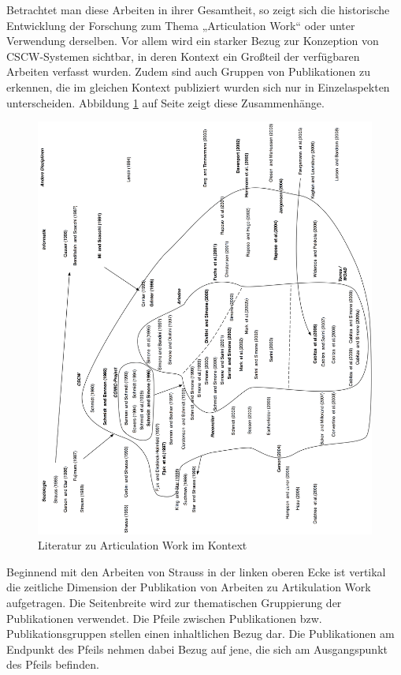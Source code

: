 Betrachtet man diese Arbeiten in ihrer Gesamtheit, so zeigt sich die historische Entwicklung der Forschung zum Thema „Articulation Work“ oder unter Verwendung derselben. Vor allem wird ein starker Bezug zur Konzeption von \gls{CSCW}-Systemen sichtbar, in deren Kontext ein Großteil der verfügbaren Arbeiten verfasst wurden. Zudem sind auch Gruppen von Publikationen zu erkennen, die im gleichen Kontext publiziert wurden sich nur in Einzelaspekten unterscheiden. Abbildung \ref{fig:img_ArticulationWork_ArticulationWorkLiteratur} auf Seite \pageref{fig:img_ArticulationWork_ArticulationWorkLiteratur} zeigt diese Zusammenhänge.

\begin{figure}[htbp]
	\centering
		\includegraphics[width=\textwidth]{img/ArticulationWork/ArticulationWorkLiteratur.png}
	\caption{Literatur zu Articulation Work im Kontext}
	\label{fig:img_ArticulationWork_ArticulationWorkLiteratur}
\end{figure}

Beginnend mit den Arbeiten von Strauss in der linken oberen Ecke ist vertikal die zeitliche Dimension der Publikation von Arbeiten zu Artikulation Work aufgetragen. Die Seitenbreite wird zur thematischen Gruppierung der Publikationen verwendet. Die Pfeile zwischen Publikationen bzw. Publikationsgruppen stellen einen inhaltlichen Bezug dar. Die Publikationen am Endpunkt des Pfeils nehmen dabei Bezug auf jene, die sich am Ausgangspunkt des Pfeils befinden.

